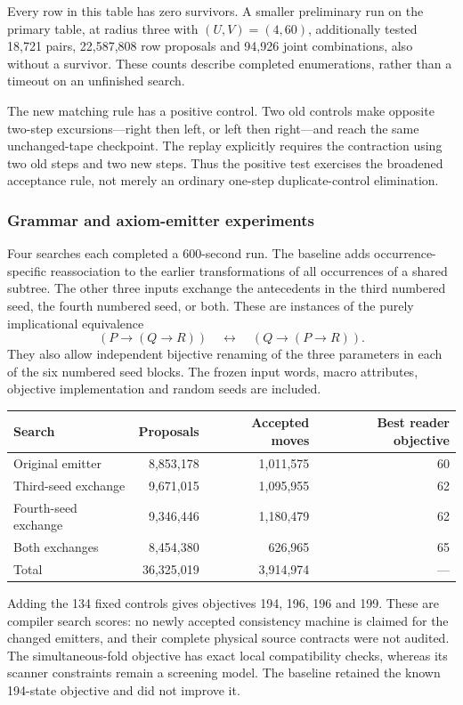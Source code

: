 Every row in this table has zero survivors. A smaller preliminary run on
the primary table, at radius three with $(U,V)=(4,60)$, additionally tested
18,721 pairs, 22,587,808 row proposals and 94,926 joint combinations, also
without a survivor. These counts describe completed enumerations, rather
than a timeout on an unfinished search.

The new matching rule has a positive control. Two old controls make
opposite two-step excursions---right then left, or left then right---and
reach the same unchanged-tape checkpoint. The replay explicitly requires
the contraction using two old steps and two new steps. Thus the positive
test exercises the broadened acceptance rule, not merely an ordinary
one-step duplicate-control elimination.

\subsubsection{Grammar and axiom-emitter experiments}

Four searches each completed a 600-second run. The baseline adds
occurrence-specific reassociation to the earlier transformations of all
occurrences of a shared subtree. The other three inputs exchange the
antecedents in the third numbered seed, the fourth numbered seed, or both.
These are instances of the purely implicational equivalence
\[
 (P\to(Q\to R))\quad\longleftrightarrow\quad(Q\to(P\to R)).
\]
They also allow independent bijective renaming of the three parameters in
each of the six numbered seed blocks. The frozen input words, macro
attributes, objective implementation and random seeds are included.

\begin{center}\small
\begin{tabular}{lrrr}
\hline
Search & Proposals & Accepted moves & Best reader objective\\
\hline
Original emitter & 8,853,178 & 1,011,575 & 60\\
Third-seed exchange & 9,671,015 & 1,095,955 & 62\\
Fourth-seed exchange & 9,346,446 & 1,180,479 & 62\\
Both exchanges & 8,454,380 & 626,965 & 65\\
\hline
Total & 36,325,019 & 3,914,974 & ---\\
\hline
\end{tabular}
\end{center}

Adding the 134 fixed controls gives objectives 194, 196, 196 and 199.
These are compiler search scores: no newly accepted consistency machine
is claimed for the changed emitters, and their complete physical source
contracts were not audited. The simultaneous-fold objective has exact
local compatibility checks, whereas its scanner constraints remain a
screening model. The baseline retained the known 194-state objective and
did not improve it.

